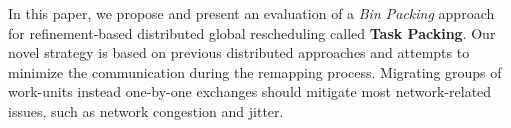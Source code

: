 In this paper, we propose and present an evaluation of a \textit{Bin Packing} approach for refinement-based distributed global rescheduling called \textbf{Task Packing}.
Our novel strategy is based on previous distributed approaches and attempts to minimize the communication during the remapping process.
Migrating groups of work-units instead one-by-one exchanges should mitigate most network-related issues, such as network congestion and jitter.

